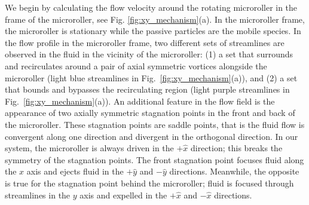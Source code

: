 \documentclass[12pt]{article}
\begin{document}
We begin by calculating the flow velocity around the rotating microroller in the frame of the microroller, see Fig. \ref{fig:xy_mechanism}(a). In the microroller frame, the microroller is stationary while the passive particles are the mobile species. In the flow profile in the microroller frame, two different sets of streamlines are observed in the fluid in the vicinity of the microroller: (1) a set that surrounds and recirculates around a pair of axial symmetric vortices alongside the microroller (light blue streamlines in Fig.~\ref{fig:xy_mechanism}(a)), and (2) a set that bounds and bypasses the recirculating region (light purple streamlines in Fig.~\ref{fig:xy_mechanism}(a)). An additional feature in the flow field is the appearance of two axially symmetric stagnation points in the front and back of the microroller. These stagnation points are saddle points, that is the fluid flow is convergent along one direction and divergent in the orthogonal direction. In our system, the microroller is always driven in the $+ \hat{x}$ direction; this breaks the symmetry of the stagnation points. The front stagnation point focuses fluid along the $x$ axis and ejects fluid in the $+ \hat{y}$ and $ -\hat{y}$ directions. Meanwhile, the opposite is true for the stagnation point behind the microroller; fluid is focused through streamlines in the $y$ axis and expelled in the $+ \hat{x}$ and $ -\hat{x}$ directions. 

\end{document}
